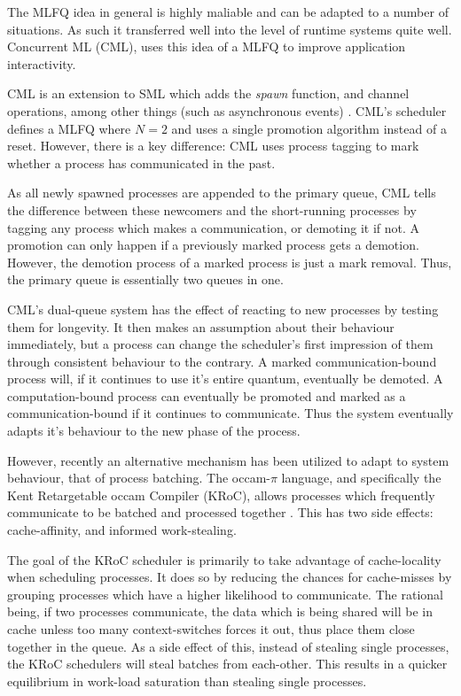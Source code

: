 The MLFQ idea in general is highly maliable and can be adapted to a number of 
situations. As such it transferred well into the level of runtime 
systems quite well. Concurrent ML (CML), uses this idea of a MLFQ to improve 
application interactivity. 

CML is an extension to SML which adds the \emph{spawn} function, and channel 
operations, among other things (such as asynchronous events) 
\cite{reppy1993concurrent}. CML's scheduler defines a MLFQ where $N=2$ and 
uses a single promotion algorithm instead of a reset. However, there is a key
difference: CML uses process tagging to mark whether a process has 
communicated in the past. 

As all newly spawned processes are appended to the
primary queue, CML tells the difference between these newcomers and the
short-running processes by tagging any process which makes a communication, or
demoting it if not. A promotion can only happen if a previously marked process
gets a demotion. However, the demotion process of a marked process is just a 
mark removal. Thus, the primary queue is essentially two queues in one. 

CML's dual-queue system has the effect of reacting to new processes by testing 
them for longevity. It then makes an assumption about their behaviour immediately, but a
process can change the scheduler's first impression of them through consistent
behaviour to the contrary. A marked communication-bound process will, if it
continues to use it's entire quantum, eventually be demoted. A computation-bound
process can eventually be promoted and marked as a communication-bound if it 
continues to communicate. Thus the system eventually adapts it's behaviour to
the new phase of the process.

However, recently an alternative mechanism has been utilized to adapt to system
behaviour, that of process batching. The occam-$\pi$ language, and specifically 
the Kent Retargetable occam Compiler (KRoC), allows processes which frequently
communicate to be batched and processed together \cite{ritson2012multicore}. 
This has two side effects: cache-affinity, and informed work-stealing.

The goal of the KRoC scheduler is primarily to take advantage of cache-locality
when scheduling processes. It does so by reducing the chances for cache-misses
by grouping processes which have a higher likelihood to communicate. The rational
being, if two processes communicate, the data which is being shared will be in
cache unless too many context-switches forces it out, thus place them close
together in the queue. As a side effect of this, instead of stealing single 
processes, the KRoC schedulers will steal batches from each-other. This results
in a quicker equilibrium in work-load saturation than stealing single processes.

